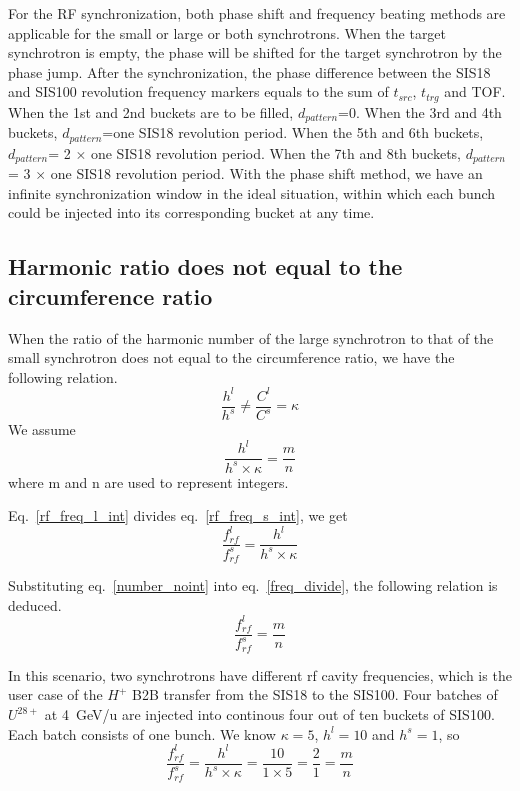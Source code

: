 For the RF synchronization, both phase shift and frequency beating methods are applicable for the small or large or both synchrotrons. When the target synchrotron is empty, the phase will be shifted for the target synchrotron by the phase jump. After the synchronization, the phase difference between the SIS18 and SIS100 revolution frequency markers equals to the sum of $t_{src}$, $t_{trg}$ and TOF. When the 1st and 2nd buckets are to be filled, $d_{pattern}$=0. When the 3rd and 4th buckets, $d_{pattern}$=one SIS18 revolution period. When the 5th and 6th buckets, $d_{pattern}$= 2 $\times$ one SIS18 revolution period. When the 7th and 8th buckets, $d_{pattern}$= 3 $\times$ one SIS18 revolution period. With the phase shift method, we have an infinite synchronization window in the ideal situation, within which each bunch could be injected into its corresponding bucket at any time. 

\subsection{Harmonic ratio does not equal to the circumference ratio} 
When the ratio of the harmonic number of the large synchrotron to that of the small synchrotron does not equal to the circumference ratio, we have the following relation.
\begin{equation}
\frac {h^{l}}{h^{s}}\neq \frac {C^{l}}{C^{s}}= \kappa  \label{harmonic_1_noint}
\end{equation}
We assume 
\begin{equation}
\frac {h^{l}}{h^{s} \times \kappa}= \frac {m}{n}  \label{number_noint}
\end{equation}
where m and n are used to represent integers.

Eq.~\ref{rf_freq_l_int} divides eq.~\ref{rf_freq_s_int}, we get
\begin{equation}
\frac{f_{rf}^{l}}{f_{rf}^{s}}= \frac{h^l}{h^s \times \kappa} \label{freq_divide}
\end{equation}

Substituting eq.~\ref{number_noint} into eq.~\ref{freq_divide}, the following relation is deduced. 
\begin{equation}
\frac{f_{rf}^{l}}{f_{rf}^{s}}= \frac{m}{n}
\end{equation}

In this scenario, two synchrotrons have different rf cavity frequencies, which is the user case of the $H^{+}$ B2B transfer from the SIS18 to the SIS100. Four batches of $U^{28+}$ at \SI{4}{GeV/\atomicmassunit} are injected into continous four out of ten buckets of SIS100. Each batch consists of one bunch. We know $\kappa=5$, $h^l=10$ and $h^s=1$, so 
\begin{equation}
\frac{f_{rf}^{l}}{f_{rf}^{s}}= \frac {h^{l}}{h^{s} \times \kappa}= \frac{10}{1 \times 5}=\frac{2}{1}=\frac {m}{n}
\end{equation}

